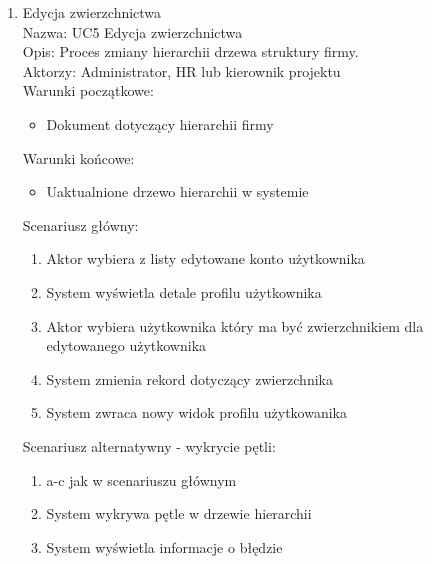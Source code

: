 \begin{enumerate}
\item Edycja zwierzchnictwa \\
Nazwa: UC5 Edycja zwierzchnictwa \\
Opis: Proces zmiany hierarchii drzewa struktury firmy. \\
Aktorzy: Administrator, HR lub kierownik projektu \\
Warunki początkowe:
\begin{itemize}
\item Dokument dotyczący hierarchii firmy
\end{itemize}
Warunki końcowe:
\begin{itemize}
\item Uaktualnione drzewo hierarchii w systemie 
\end{itemize}
Scenariusz główny:
\begin{enumerate}
\item Aktor wybiera z listy edytowane konto użytkownika
\item System wyświetla detale profilu użytkownika
\item Aktor wybiera użytkownika który ma być zwierzchnikiem dla edytowanego użytkownika
\item System zmienia rekord dotyczący zwierzchnika
\item System zwraca nowy widok profilu użytkowanika
\end{enumerate}
Scenariusz alternatywny - wykrycie pętli: 
\begin{enumerate}
\item a-c jak w scenariuszu głównym
\item System wykrywa pętle w drzewie hierarchii
\item System wyświetla informacje o błędzie
\end{enumerate}

\end{enumerate}